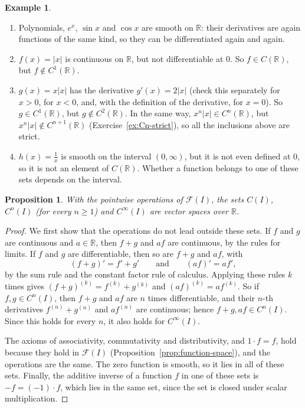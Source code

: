 \documentclass[11pt]{article}
\theoremstyle{definition}
\newtheorem{example}[definition]{Example}
\theoremstyle{plain}
\newtheorem{proposition}[definition]{Proposition}
\theoremstyle{remark}
\begin{document}
\begin{example}\label{ex:Cn-functions}
    \begin{enumerate}
        \item Polynomials, $e^x$, $\sin x$ and $\cos x$ are smooth on $\mathbb{R}$: their derivatives are again functions of the same kind, so they can be differentiated again and again.
        \item $f(x) = |x|$ is continuous on $\mathbb{R}$, but not differentiable at $0$. So $f \in C(\mathbb{R})$, but $f \notin C^1(\mathbb{R})$.
        \item $g(x) = x|x|$ has the derivative $g'(x) = 2|x|$ (check this separately for $x > 0$, for $x < 0$, and, with the definition of the derivative, for $x = 0$). So $g \in C^1(\mathbb{R})$, but $g \notin C^2(\mathbb{R})$. In the same way, $x^n|x| \in C^n(\mathbb{R})$, but $x^n|x| \notin C^{n+1}(\mathbb{R})$ (Exercise~\ref{ex:Cn-strict}), so all the inclusions above are strict.
        \item $h(x) = \frac{1}{x}$ is smooth on the interval $(0, \infty)$, but it is not even defined at $0$, so it is not an element of $C(\mathbb{R})$. Whether a function belongs to one of these sets depends on the interval.
    \end{enumerate}
\end{example}

\begin{proposition}\label{prop:Cn-spaces}
    With the pointwise operations of $\mathcal{F}(I)$, the sets $C(I)$, $C^n(I)$ (for every $n \geq 1$) and $C^\infty(I)$ are vector spaces over $\mathbb{R}$.
\end{proposition}

\begin{proof}
    We first show that the operations do not lead outside these sets. If $f$ and $g$ are continuous and $a \in \mathbb{R}$, then $f + g$ and $af$ are continuous, by the rules for limits. If $f$ and $g$ are differentiable, then so are $f + g$ and $af$, with
    \[(f + g)' = f' + g' \qquad \text{and} \qquad (af)' = a f',\]
    by the sum rule and the constant factor rule of calculus. Applying these rules $k$ times gives $(f + g)^{(k)} = f^{(k)} + g^{(k)}$ and $(af)^{(k)} = a f^{(k)}$. So if $f, g \in C^n(I)$, then $f + g$ and $af$ are $n$ times differentiable, and their $n$-th derivatives $f^{(n)} + g^{(n)}$ and $a f^{(n)}$ are continuous; hence $f + g, af \in C^n(I)$. Since this holds for every $n$, it also holds for $C^\infty(I)$.

    The axioms of associativity, commutativity and distributivity, and $1 \cdot f = f$, hold because they hold in $\mathcal{F}(I)$ (Proposition~\ref{prop:function-space}), and the operations are the same. The zero function is smooth, so it lies in all of these sets. Finally, the additive inverse of a function $f$ in one of these sets is $-f = (-1) \cdot f$, which lies in the same set, since the set is closed under scalar multiplication.
\end{proof}
\end{document}

